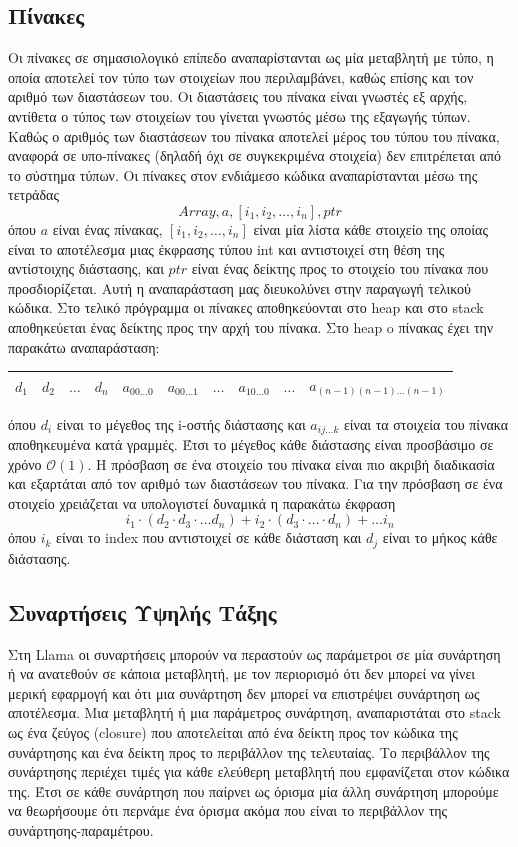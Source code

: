 \documentclass[12pt]{article}
\newcommand{\Llama}{\textsf{Llama }}
\begin{document}
\subsection{Πίνακες}
Οι πίνακες σε σημασιολογικό επίπεδο αναπαρίστανται ως μία μεταβλητή με τύπο, η οποία αποτελεί τον τύπο των στοιχείων που περιλαμβάνει, καθώς επίσης και τον αριθμό των διαστάσεων του. Οι διαστάσεις του πίνακα είναι γνωστές εξ αρχής, αντίθετα ο τύπος των στοιχείων του γίνεται γνωστός μέσω της εξαγωγής τύπων. Καθώς ο αριθμός των διαστάσεων του πίνακα αποτελεί μέρος του τύπου του πίνακα, αναφορά σε υπο-πίνακες (δηλαδή όχι σε συγκεκριμένα στοιχεία) δεν επιτρέπεται από το σύστημα τύπων.
Οι πίνακες στον ενδιάμεσο κώδικα αναπαρίστανται μέσω της τετράδας $$Array, a, [i_1,i_2, \ldots, i_n], ptr$$ όπου $a$ είναι ένας πίνακας, $[i_1, i_2, \ldots, i_n]$ είναι μία λίστα κάθε στοιχείο της οποίας είναι το αποτέλεσμα μιας έκφρασης τύπου int και αντιστοιχεί στη θέση της αντίστοιχης διάστασης, και $ptr$ είναι ένας δείκτης προς το στοιχείο του πίνακα που προσδιορίζεται.  Αυτή η αναπαράσταση μας διευκολύνει στην παραγωγή τελικού κώδικα. Στο τελικό πρόγραμμα οι πίνακες αποθηκεύονται στο heap και στο stack αποθηκεύεται ένας δείκτης προς την αρχή του πίνακα. Στο heap o πίνακας έχει την παρακάτω αναπαράσταση:

\begin{table}[htbp]
\centering
    \begin{tabular}{|l|c|l|l|l|l|l|l|l|c|}
    \hline
    $d_1$ & $d_2$ & $\ldots$ & $d_n$ & $a_{00\ldots0}$ & $a_{00\ldots1}$ & $\ldots$ & $a_{10\ldots0}$ & $\ldots$ & $a_{(n-1)(n-1)\ldots(n-1)}$ \\ \hline
    \end{tabular}
\end{table}
όπου $d_i$ είναι το μέγεθος της i-οστής διάστασης και $a_{ij \ldots k}$ είναι τα στοιχεία του πίνακα αποθηκευμένα κατά γραμμές. Έτσι το μέγεθος κάθε διάστασης είναι προσβάσιμο σε χρόνο $\mathcal{O}(1)$. Η πρόσβαση σε ένα στοιχείο του πίνακα είναι πιο ακριβή διαδικασία και εξαρτάται από τον αριθμό των διαστάσεων του πίνακα. Για την πρόσβαση σε ένα στοιχείο χρειάζεται να υπολογιστεί δυναμικά η παρακάτω έκφραση
$$i_1 \cdot (d_2 \cdot d_3 \cdot \ldots d_n) + i_2 \cdot (d_3 \cdot \ldots \cdot d_n) + \ldots i_n$$
όπου $i_k$ είναι το index που αντιστοιχεί σε κάθε διάσταση και $d_j$ είναι το μήκος κάθε διάστασης.
\subsection{Συναρτήσεις Υψηλής Τάξης}
Στη \Llama οι συναρτήσεις μπορούν να περαστούν ως παράμετροι σε μία συνάρτηση ή να ανατεθούν σε κάποια μεταβλητή, με τον περιορισμό ότι δεν μπορεί να γίνει μερική εφαρμογή και ότι μια συνάρτηση δεν μπορεί να επιστρέψει συνάρτηση ως αποτέλεσμα. Μια μεταβλητή ή μια παράμετρος συνάρτηση, αναπαριστάται στο stack ως ένα ζεύγος (closure) που αποτελείται από ένα δείκτη προς τον κώδικα της συνάρτησης και ένα δείκτη προς το περιβάλλον της τελευταίας. Το περιβάλλον της συνάρτησης περιέχει τιμές για κάθε ελεύθερη μεταβλητή που εμφανίζεται στον κώδικα της. Έτσι σε κάθε συνάρτηση που παίρνει ως όρισμα μία άλλη συνάρτηση μπορούμε να θεωρήσουμε ότι περνάμε ένα όρισμα ακόμα που είναι το περιβάλλον της συνάρτησης-παραμέτρου.
\end{document}
